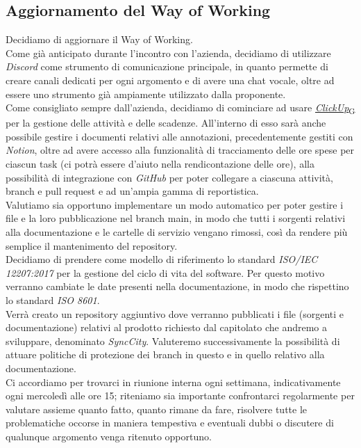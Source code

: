 \documentclass[italian,12pt]{article}
\begin{document}
\subsection{Aggiornamento del Way of Working}
Decidiamo di aggiornare il Way of Working. \\
Come già anticipato durante l'incontro con l'azienda, decidiamo di utilizzare \textit{Discord} come strumento di comunicazione principale, in quanto permette di creare canali dedicati per ogni argomento e di avere una chat vocale, oltre ad essere uno strumento già ampiamente utilizzato dalla proponente. \\
Come consigliato sempre dall'azienda, decidiamo di cominciare ad usare \href{https://7last.github.io/docs/rtb/documentazione-interna/glossario#clickup}{\textit{ClickUp}\textsubscript{G}} per la gestione delle attività e delle scadenze. All'interno di esso sarà anche possibile gestire i documenti relativi alle annotazioni, precedentemente gestiti con \textit{Notion}, oltre ad avere accesso alla funzionalità di tracciamento delle ore spese per ciascun task (ci potrà essere d'aiuto nella rendicontazione delle ore), alla possibilità di integrazione con \textit{GitHub} per poter collegare a ciascuna attività, branch e pull request e ad un'ampia gamma di reportistica. \\
Valutiamo sia opportuno implementare un modo automatico per poter gestire i file e la loro pubblicazione nel branch main, in modo che tutti i sorgenti relativi alla documentazione e le cartelle di servizio vengano rimossi, così da rendere più semplice il mantenimento del repository. \\
Decidiamo di prendere come modello di riferimento lo standard \textit{ISO/IEC 12207:2017} per la gestione del ciclo di vita del software. Per questo motivo verranno cambiate le date presenti nella documentazione, in modo che rispettino lo standard \textit{ISO 8601}. \\
Verrà creato un repository aggiuntivo dove verranno pubblicati i file (sorgenti e documentazione) relativi al prodotto 
richiesto dal capitolato che andremo a sviluppare, denominato \textit{SyncCity}. Valuteremo successivamente 
la possibilità di attuare politiche di protezione dei branch in questo e in quello relativo alla documentazione. \\
Ci accordiamo per trovarci in riunione interna ogni settimana, indicativamente ogni mercoledì alle ore 15; riteniamo sia importante confrontarci regolarmente per valutare assieme quanto fatto, quanto rimane da fare, risolvere tutte le problematiche occorse in maniera tempestiva e eventuali dubbi o discutere di qualunque argomento venga ritenuto opportuno.
\end{document}
